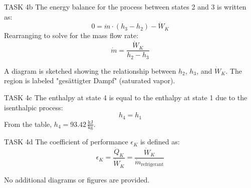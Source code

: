 TASK 4b  
The energy balance for the process between states 2 and 3 is written as:  
\[
0 = \dot{m} \cdot (h_3 - h_2) - \dot{W}_K
\]  
Rearranging to solve for the mass flow rate:  
\[
\dot{m} = \frac{\dot{W}_K}{h_2 - h_3}
\]  

A diagram is sketched showing the relationship between \( h_2 \), \( h_3 \), and \( \dot{W}_K \). The region is labeled "gesättigter Dampf" (saturated vapor).  

TASK 4c  
The enthalpy at state 4 is equal to the enthalpy at state 1 due to the isenthalpic process:  
\[
h_4 = h_1
\]  
From the table, \( h_4 = 93.42 \, \frac{\text{kJ}}{\text{kg}} \).  

TASK 4d  
The coefficient of performance \( \epsilon_K \) is defined as:  
\[
\epsilon_K = \frac{\dot{Q}_K}{\dot{W}_K} = \frac{\dot{W}_K}{\dot{m}_{\text{refrigerant}}}
\]  

No additional diagrams or figures are provided.
